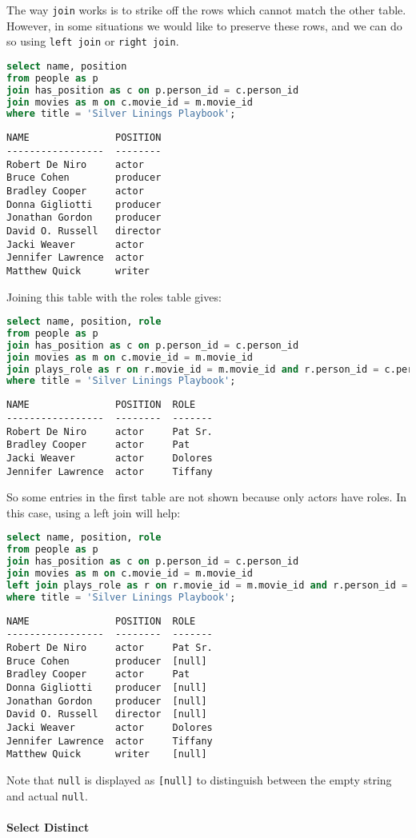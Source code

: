 \documentclass[12pt,a4paper]{article} %
\begin{document}
The way \verb|join| works is to strike off the rows which cannot match the other table. However, in some situations we would like to preserve these rows, and we can do so using \verb|left join| or \verb|right join|.
\begin{lstlisting}[language=sql]
select name, position
from people as p
join has_position as c on p.person_id = c.person_id
join movies as m on c.movie_id = m.movie_id
where title = 'Silver Linings Playbook';
\end{lstlisting}
\begin{lstlisting}
NAME               POSITION
-----------------  --------
Robert De Niro     actor
Bruce Cohen        producer
Bradley Cooper     actor
Donna Gigliotti    producer
Jonathan Gordon    producer
David O. Russell   director
Jacki Weaver       actor
Jennifer Lawrence  actor
Matthew Quick      writer
\end{lstlisting}
Joining this table with the roles table gives:
\begin{lstlisting}[language=sql]
select name, position, role
from people as p
join has_position as c on p.person_id = c.person_id
join movies as m on c.movie_id = m.movie_id
join plays_role as r on r.movie_id = m.movie_id and r.person_id = c.person_id
where title = 'Silver Linings Playbook';
\end{lstlisting}
\begin{lstlisting}
NAME               POSITION  ROLE
-----------------  --------  -------
Robert De Niro     actor     Pat Sr.
Bradley Cooper     actor     Pat
Jacki Weaver       actor     Dolores
Jennifer Lawrence  actor     Tiffany
\end{lstlisting}
So some entries in the first table are not shown because only actors have roles. In this case, using a left join will help:
\begin{lstlisting}[language=sql]
select name, position, role
from people as p
join has_position as c on p.person_id = c.person_id
join movies as m on c.movie_id = m.movie_id
left join plays_role as r on r.movie_id = m.movie_id and r.person_id = c.person_id
where title = 'Silver Linings Playbook';
\end{lstlisting}
\begin{lstlisting}
NAME               POSITION  ROLE
-----------------  --------  -------
Robert De Niro     actor     Pat Sr.
Bruce Cohen        producer  [null]
Bradley Cooper     actor     Pat
Donna Gigliotti    producer  [null]
Jonathan Gordon    producer  [null]
David O. Russell   director  [null]
Jacki Weaver       actor     Dolores
Jennifer Lawrence  actor     Tiffany
Matthew Quick      writer    [null]
\end{lstlisting}
Note that \verb|null| is displayed as \verb|[null]| to distinguish between the empty string and actual \verb|null|.
\\\\
\textbf{Select Distinct}
\end{document}
